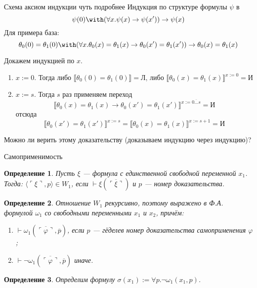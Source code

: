 \documentclass[aspectratio=169]{beamer}
\newtheorem{dfn}{Определение}[section]
\begin{document}
\begin{frame}{Схема аксиом индукции чуть подробнее}
Индукция по структуре формулы $\psi$ в $$\psi(0) \with (\forall x.\psi(x) \rightarrow \psi(x')) \rightarrow \psi(x)$$
Для примера база: $$\theta_0(0) = \theta_1(0) \with (\forall x.\theta_0(x) = \theta_1(x) \rightarrow \theta_0(x') = \theta_1(x')) \rightarrow \theta_0(x) = \theta_1(x)$$

Докажем индукцией по $x$.
\begin{enumerate}
\item $x := 0$. Тогда либо $\llbracket \theta_0(0) = \theta_1(0) \rrbracket = \text{Л}$, 
либо $\llbracket \theta_0(x) = \theta_1(x) \rrbracket^{x := 0} = \text{И}$
\item $x := s$. Тогда $s$ раз применяем переход $$\llbracket \theta_0(x) = \theta_1(x) \rightarrow \theta_0(x') = \theta_1(x') \rrbracket^{x := \overline{0\dots s}} = \text{И}$$
отсюда $$\llbracket\theta_0(x') = \theta_1(x') \rrbracket^{x := s} = \llbracket\theta_0(x) = \theta_1(x) \rrbracket^{x := s+1} = \text{И}$$
\end{enumerate}

\pause
Можно ли верить этому доказательству (доказываем индукцию через индукцию)?
\end{frame}

\begin{frame}{Самоприменимость}
\begin{dfn}Пусть $\xi$ --- формула с единственной свободной
переменной $x_1$. Тогда:
$\langle\ulcorner \xi \urcorner,p\rangle \in W_1$, если $\vdash \xi(\overline{\ulcorner \xi \urcorner})$ и $p$ --- номер доказательства.
\end{dfn}

\begin{dfn}Отношение $W_1$ рекурсивно, поэтому выражено в Ф.А. формулой $\omega_1$ со свободными переменными $x_1$ и $x_2$, причём:
\begin{enumerate}
\item $\vdash \omega_1(\overline{\ulcorner \varphi \urcorner},\overline{p})$, если $p$ --- гёделев номер
доказательства самоприменения $\varphi$;
\item $\vdash \neg\omega_1(\overline{\ulcorner \varphi \urcorner},\overline{p})$ иначе.
\end{enumerate}
\end{dfn}

\begin{dfn}
Определим формулу $\sigma(x_1) := \forall p.\neg\omega_1(x_1,p)$. 
\end{dfn}
\end{frame}
\end{document}
